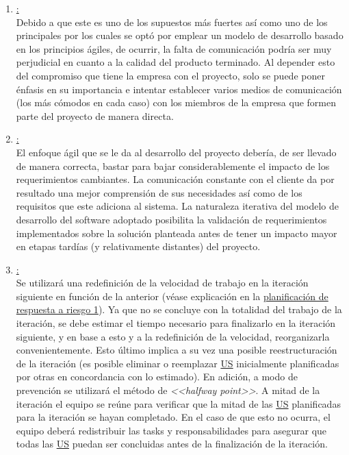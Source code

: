 \documentclass[a4paper, 12pt,twoside]{report}  %
\numberwithin{equation}{subsection} %
\begin{document}
\begin{enumerate}
	\item \underline{:}\\
	Debido a que este es uno de los supuestos más fuertes así como uno de los principales por los cuales se optó por emplear un modelo de desarrollo basado en los principios ágiles, de ocurrir, la falta de comunicación podría ser muy perjudicial en cuanto a la calidad del producto terminado. Al depender esto del compromiso que tiene la empresa con el proyecto, solo se puede poner énfasis en su importancia e intentar establecer varios medios de comunicación (los más cómodos en cada caso) con los miembros de la empresa que formen parte del proyecto de manera directa.
	\item \underline{:}\\
	El enfoque ágil que se le da al desarrollo del proyecto debería, de ser llevado de manera correcta, bastar para bajar considerablemente el impacto de los requerimientos cambiantes. La comunicación constante con el cliente da por resultado una mejor comprensión de sus necesidades así como de los requisitos que este adiciona al sistema. La naturaleza iterativa del modelo de desarrollo del software adoptado posibilita la validación de requerimientos implementados sobre la solución planteada antes de tener un impacto mayor en etapas tardías (y relativamente distantes) del proyecto.
	\item \underline{:}\\
	Se utilizará una redefinición de la velocidad de trabajo en la iteración siguiente en función de la anterior (véase explicación en la \hyperlink{planificacion_respuesta_riesgo_uno}{planificación de respuesta a riesgo 1}). Ya que no se concluye con la totalidad del trabajo de la iteración, se debe estimar el tiempo necesario para finalizarlo en la iteración siguiente, y en base a esto y a la redefinición de la velocidad, reorganizarla convenientemente. Esto último implica a su vez una posible reestructuración de la iteración (es posible eliminar o reemplazar \hyperlink{US}{US} inicialmente planificadas por otras en concordancia con lo estimado).
	En adición, a modo de prevención se utilizará el método de \textit{<<halfway point>>}. A mitad de la iteración el equipo se reúne para verificar que la mitad de las \hyperlink{US}{US} planificadas para la iteración se hayan completado. En el caso de que esto no ocurra, el equipo deberá redistribuir las tasks y responsabilidades para asegurar que todas las \hyperlink{US}{US} puedan ser concluidas antes de la finalización de la iteración.
\end{enumerate}
\end{document}

